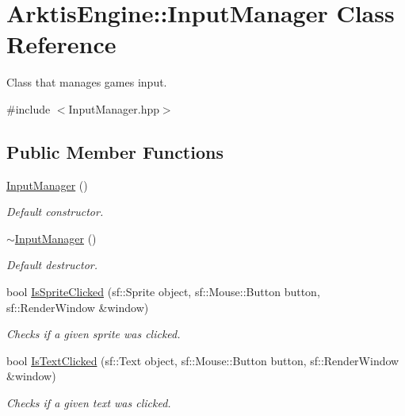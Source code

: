 \hypertarget{class_arktis_engine_1_1_input_manager}{}\section{Arktis\+Engine\+::Input\+Manager Class Reference}
\label{class_arktis_engine_1_1_input_manager}


Class that manages game\textquotesingle{}s input.  




{\ttfamily \#include $<$Input\+Manager.\+hpp$>$}

\subsection*{Public Member Functions}
\begin{DoxyCompactItemize}
\item 
\mbox{\hyperlink{class_arktis_engine_1_1_input_manager_af15067de706f4e40cf9c0315ec911b64}{Input\+Manager}} ()
\begin{DoxyCompactList}\small\item\em Default constructor. \end{DoxyCompactList}\item 
\mbox{\hyperlink{class_arktis_engine_1_1_input_manager_a9e73e0af9adc36ae1d73483618dbc306}{$\sim$\+Input\+Manager}} ()
\begin{DoxyCompactList}\small\item\em Default destructor. \end{DoxyCompactList}\item 
bool \mbox{\hyperlink{class_arktis_engine_1_1_input_manager_a257bf6e6aae99480273142138a59a489}{Is\+Sprite\+Clicked}} (sf\+::\+Sprite object, sf\+::\+Mouse\+::\+Button button, sf\+::\+Render\+Window \&window)
\begin{DoxyCompactList}\small\item\em Checks if a given sprite was clicked. \end{DoxyCompactList}\item 
bool \mbox{\hyperlink{class_arktis_engine_1_1_input_manager_a81e17fadc0c2a29bdbafdda244f026c8}{Is\+Text\+Clicked}} (sf\+::\+Text object, sf\+::\+Mouse\+::\+Button button, sf\+::\+Render\+Window \&window)
\begin{DoxyCompactList}\small\item\em Checks if a given text was clicked. \end{DoxyCompactList}\item 

\end{DoxyCompactItemize}
